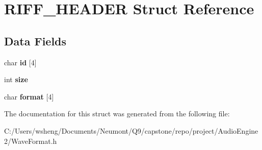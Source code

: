 \hypertarget{struct_r_i_f_f___h_e_a_d_e_r}{}\section{R\+I\+F\+F\+\_\+\+H\+E\+A\+D\+ER Struct Reference}
\label{struct_r_i_f_f___h_e_a_d_e_r}
\subsection*{Data Fields}
\begin{DoxyCompactItemize}
\item 
\mbox{\label{struct_r_i_f_f___h_e_a_d_e_r_ace593da5319500315498c8f845ee2368}} 
char {\bfseries id} \mbox{[}4\mbox{]}
\item 
\mbox{\label{struct_r_i_f_f___h_e_a_d_e_r_a439227feff9d7f55384e8780cfc2eb82}} 
int {\bfseries size}
\item 
\mbox{\label{struct_r_i_f_f___h_e_a_d_e_r_a9a46791e5b7f6fe6acaca9ab6b5f764e}} 
char {\bfseries format} \mbox{[}4\mbox{]}
\end{DoxyCompactItemize}


The documentation for this struct was generated from the following file\+:\begin{DoxyCompactItemize}
\item 
C\+:/\+Users/wsheng/\+Documents/\+Neumont/\+Q9/capstone/repo/project/\+Audio\+Engine2/Wave\+Format.\+h\end{DoxyCompactItemize}
